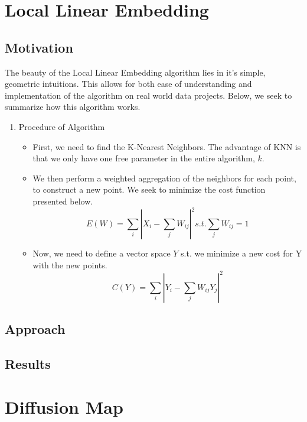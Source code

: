 \documentclass[12pt]{article}
\begin{document}
\section{Local Linear Embedding} \label{sec:Local Linear Embedding}

\subsection{Motivation}
\hspace{5mm}
The beauty of the Local Linear Embedding algorithm lies in it's simple, geometric intuitions. This allows for both ease of understanding and implementation of the algorithm on real world data projects. Below, we seek to summarize how this algorithm works.

\begin{enumerate}
    \item Procedure of Algorithm
    \begin{itemize}
        \item First, we need to find the K-Nearest Neighbors. The advantage of KNN is that we only have one free parameter in the entire algorithm, $k.$
        \item We then perform a weighted aggregation of the neighbors for each point, to construct a new point. We seek to minimize the cost function presented below.
        \begin{equation}
            E(W)=\sum\limits_i|X_i-\sum\limits_jW_{ij}|^2 s.t. \sum\limits_jW_{ij}=1
        \end{equation}
        \item Now, we need to define a vector space $Y$ s.t. we minimize a new cost for Y with the new points.
        \begin{equation}
            C(Y)=\sum\limits_i|Y_i-\sum\limits_jW_{ij}Y_j|^2
        \end{equation}
    \end{itemize}
\end{enumerate}

\subsection{Approach}

\subsection{Results}

\section{Diffusion Map} \label{sec: Diffusion Map}
\end{document}
